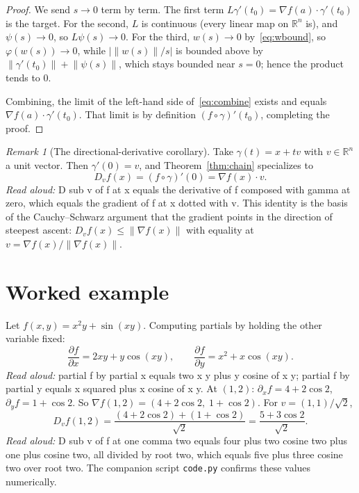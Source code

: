 \documentclass[11pt]{article}
\theoremstyle{definition}
\theoremstyle{remark}
\newtheorem{remark}[theorem]{Remark}
\newcommand{\R}{\mathbb{R}}
\newcommand{\norm}[1]{\left\lVert #1 \right\rVert}
\newcommand{\grad}{\nabla}
\begin{document}
\begin{proof}
We send $s \to 0$ term by term. The first term $L \gamma'(t_0) = \grad f(a) \cdot \gamma'(t_0)$ is the target. For the second, $L$ is continuous (every linear map on $\R^n$ is), and $\psi(s) \to 0$, so $L \psi(s) \to 0$. For the third, $w(s) \to 0$ by~\eqref{eq:wbound}, so $\varphi(w(s)) \to 0$, while $|\norm{w(s)}/s|$ is bounded above by $\norm{\gamma'(t_0)} + \norm{\psi(s)}$, which stays bounded near $s = 0$; hence the product tends to $0$.

Combining, the limit of the left-hand side of~\eqref{eq:combine} exists and equals $\grad f(a) \cdot \gamma'(t_0)$. That limit is by definition $(f \circ \gamma)'(t_0)$, completing the proof.
\end{proof}

\begin{remark}[The directional-derivative corollary]
Take $\gamma(t) = x + t v$ with $v \in \R^n$ a unit vector. Then $\gamma'(0) = v$, and Theorem~\ref{thm:chain} specializes to
\[
D_v f(x) = (f \circ \gamma)'(0) = \grad f(x) \cdot v.
\]
\emph{Read aloud:} D sub v of f at x equals the derivative of f composed with gamma at zero, which equals the gradient of f at x dotted with v.
This identity is the basis of the Cauchy--Schwarz argument that the gradient points in the direction of steepest ascent: $D_v f(x) \le \norm{\grad f(x)}$ with equality at $v = \grad f(x)/\norm{\grad f(x)}$.
\end{remark}

\section{Worked example}

Let $f(x,y) = x^2 y + \sin(xy)$. Computing partials by holding the other variable fixed:
\[
\frac{\partial f}{\partial x} = 2xy + y\cos(xy), \qquad \frac{\partial f}{\partial y} = x^2 + x\cos(xy).
\]
\emph{Read aloud:} partial f by partial x equals two x y plus y cosine of x y; partial f by partial y equals x squared plus x cosine of x y.
At $(1,2)$: $\partial_x f = 4 + 2\cos 2$, $\partial_y f = 1 + \cos 2$. So $\grad f(1,2) = (4 + 2\cos 2,\; 1 + \cos 2)$. For $v = (1,1)/\sqrt 2$,
\[
D_v f(1,2) = \frac{(4 + 2\cos 2) + (1 + \cos 2)}{\sqrt 2} = \frac{5 + 3\cos 2}{\sqrt 2}.
\]
\emph{Read aloud:} D sub v of f at one comma two equals four plus two cosine two plus one plus cosine two, all divided by root two, which equals five plus three cosine two over root two.
The companion script \texttt{code.py} confirms these values numerically.
\end{document}
